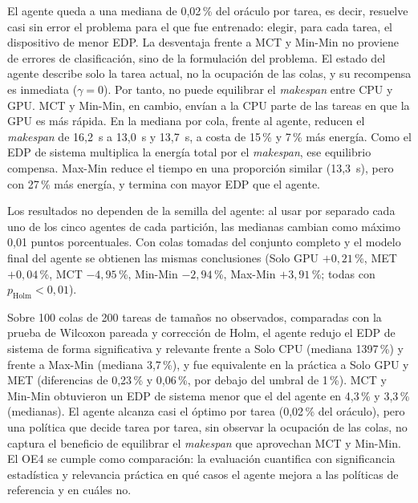 El agente queda a una mediana de 0,02\,\% del oráculo por tarea, es decir, resuelve casi sin
error el problema para el que fue entrenado: elegir, para cada tarea, el dispositivo de menor
EDP. La desventaja frente a MCT y Min-Min no proviene de errores de clasificación, sino de la
formulación del problema. El estado del agente describe solo la tarea actual, no la ocupación
de las colas, y su recompensa es inmediata ($\gamma = 0$). Por tanto, no puede equilibrar el
\textit{makespan} entre CPU y GPU. MCT y Min-Min, en cambio, envían a la CPU parte de las
tareas en que la GPU es más rápida. En la mediana por cola, frente al agente, reducen el
\textit{makespan} de 16,2~s a 13,0~s y 13,7~s, a costa de 15\,\% y 7\,\% más energía. Como el
EDP de sistema multiplica la energía total por el \textit{makespan}, ese equilibrio compensa.
Max-Min reduce el tiempo en una proporción similar (13,3~s), pero con 27\,\% más energía, y
termina con mayor EDP que el agente.

Los resultados no dependen de la semilla del agente: al usar por separado cada uno de los
cinco agentes de cada partición, las medianas cambian como máximo 0,01 puntos porcentuales.
Con colas tomadas del conjunto completo y el modelo final del agente se obtienen las mismas
conclusiones (Solo GPU $+0{,}21$\,\%, MET $+0{,}04$\,\%, MCT $-4{,}95$\,\%, Min-Min
$-2{,}94$\,\%, Max-Min $+3{,}91$\,\%; todas con $p_{\mathrm{Holm}} < 0{,}01$).



Sobre 100 colas de 200 tareas de tamaños no observados, comparadas con la prueba de Wilcoxon
pareada y corrección de Holm, el agente redujo el EDP de sistema de forma significativa y
relevante frente a Solo CPU (mediana 1397\,\%) y frente a Max-Min (mediana 3,7\,\%), y fue
equivalente en la práctica a Solo GPU y MET (diferencias de 0,23\,\% y 0,06\,\%, por debajo
del umbral de 1\,\%). MCT y Min-Min obtuvieron un EDP de sistema menor que el del agente en
4,3\,\% y 3,3\,\% (medianas). El agente alcanza casi el óptimo por tarea (0,02\,\% del
oráculo), pero una política que decide tarea por tarea, sin observar la ocupación de las
colas, no captura el beneficio de equilibrar el \textit{makespan} que aprovechan MCT y
Min-Min. El OE4 se cumple como comparación: la evaluación cuantifica con significancia
estadística y relevancia práctica en qué casos el agente mejora a las políticas de referencia
y en cuáles no.


